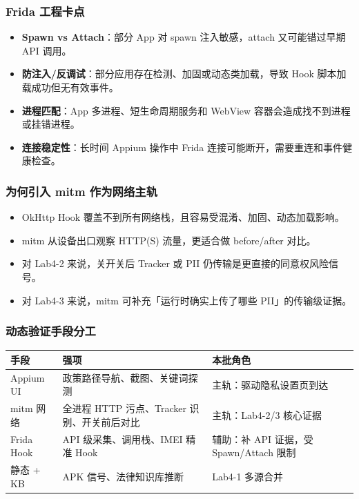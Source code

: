 \documentclass[AutoFakeBold,AutoFakeSlant]{beamer}
\begin{document}
\begin{frame}
    \frametitle{Frida 工程卡点}
    \small
    \begin{itemize}
        \item \textbf{Spawn vs Attach}：部分 App 对 spawn 注入敏感，attach 又可能错过早期 API 调用。
        \item \textbf{防注入/反调试}：部分应用存在检测、加固或动态类加载，导致 Hook 脚本加载成功但无有效事件。
        \item \textbf{进程匹配}：App 多进程、短生命周期服务和 WebView 容器会造成找不到进程或挂错进程。
        \item \textbf{连接稳定性}：长时间 Appium 操作中 Frida 连接可能断开，需要重连和事件健康检查。
    \end{itemize}
\end{frame}

\begin{frame}
    \frametitle{为何引入 mitm 作为网络主轨}
    \small
    \begin{itemize}
        \item OkHttp Hook 覆盖不到所有网络栈，且容易受混淆、加固、动态加载影响。
        \item mitm 从设备出口观察 HTTP(S) 流量，更适合做 before/after 对比。
        \item 对 Lab4-2 来说，关开关后 Tracker 或 PII 仍传输是更直接的同意权风险信号。
        \item 对 Lab4-3 来说，mitm 可补充「运行时确实上传了哪些 PII」的传输级证据。
    \end{itemize}
\end{frame}

\begin{frame}
    \frametitle{动态验证手段分工}
    \small
    \begin{tabularx}{\textwidth}{|l|X|X|}
        \hline
        \textbf{手段} & \textbf{强项} & \textbf{本批角色} \\
        \hline
        Appium UI & 政策路径导航、截图、关键词探测 & 主轨：驱动隐私设置页到达 \\
        \hline
        mitm 网络 & 全进程 HTTP 污点、Tracker 识别、开关前后对比 & 主轨：Lab4-2/3 核心证据 \\
        \hline
        Frida Hook & API 级采集、调用栈、IMEI 精准 Hook & 辅助：补 API 证据，受 Spawn/Attach 限制 \\
        \hline
        静态 + KB & APK 信号、法律知识库推断 & Lab4-1 多源合并 \\
        \hline
    \end{tabularx}
\end{frame}
\end{document}
